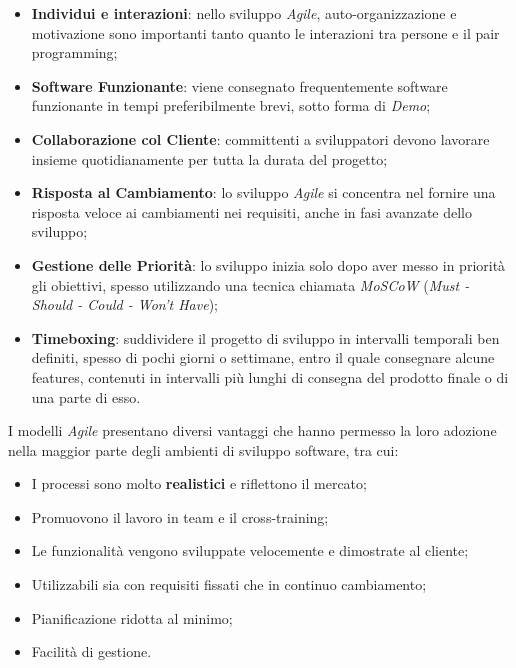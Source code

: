 \documentclass[../main.tex]{subfiles}
\begin{document}
        		\begin{itemize}
        			\item \textbf{Individui e interazioni}: nello sviluppo \emph{Agile}, auto-organizzazione e motivazione sono importanti tanto quanto le interazioni tra persone e il pair programming;
        			\item \textbf{Software Funzionante}: viene consegnato frequentemente software funzionante in tempi preferibilmente brevi, sotto forma di \emph{Demo};
        			\item \textbf{Collaborazione col Cliente}: committenti a sviluppatori devono lavorare insieme quotidianamente per tutta la durata del progetto;
        			\item \textbf{Risposta al Cambiamento}: lo sviluppo \emph{Agile} si concentra nel fornire una risposta veloce ai cambiamenti nei requisiti, anche in fasi avanzate dello sviluppo;
        			\item \textbf{Gestione delle Priorità}: lo sviluppo inizia solo dopo aver messo in priorità gli obiettivi, spesso utilizzando una tecnica chiamata \emph{MoSCoW} (\emph{Must - Should - Could - Won't Have});
        			\item \textbf{Timeboxing}: suddividere il progetto di sviluppo in intervalli temporali ben definiti, spesso di pochi giorni o settimane, entro il quale consegnare alcune features, contenuti in intervalli più lunghi di consegna del prodotto finale o di una parte di esso.
        		\end{itemize}
        	
        		I modelli \emph{Agile} presentano diversi vantaggi che hanno permesso la loro adozione nella maggior parte degli ambienti di sviluppo software, tra cui:
        		\begin{itemize}
        			\item I processi sono molto \textbf{realistici} e riflettono il mercato;
        			\item Promuovono il lavoro in team e il cross-training;
        			\item Le funzionalità vengono sviluppate velocemente e dimostrate al cliente;
        			\item Utilizzabili sia con requisiti fissati che in continuo cambiamento;
        			\item Pianificazione ridotta al minimo;
        			\item Facilità di gestione.
        		\end{itemize}
        	
\end{document}
